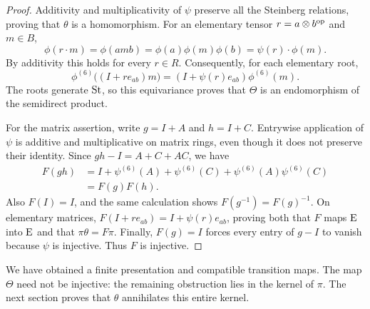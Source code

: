 \begin{proof}
Additivity and multiplicativity of $\psi$ preserve all the
Steinberg relations, proving that $\theta$ is a homomorphism.
For an elementary tensor $r=a\otimes b^{\mathrm{op}}$ and $m\in B$,
\[
 \phi(r\cdot m)=\phi(amb)
   =\phi(a)\phi(m)\phi(b)
   =\psi(r)\cdot\phi(m).
\]
By additivity this holds for every $r\in R$.  Consequently, for
each elementary root,
\[
 \phi^{(6)}\bigl((I+r e_{ab})m\bigr)
   =(I+\psi(r)e_{ab})\phi^{(6)}(m).
\]
The roots generate $\operatorname{St}$, so this equivariance proves that
$\Theta$ is an endomorphism of the semidirect product.

For the matrix assertion, write $g=I+A$ and $h=I+C$.
Entrywise application of $\psi$ is additive and multiplicative
on matrix rings, even though it does not preserve their identity.
Since $gh-I=A+C+AC$, we have
\begin{align*}
 F(gh)
  &=I+\psi^{(6)}(A)+\psi^{(6)}(C)
       +\psi^{(6)}(A)\psi^{(6)}(C)\\
  &=F(g)F(h).
\end{align*}
Also $F(I)=I$, and the same calculation shows
$F(g^{-1})=F(g)^{-1}$.  On elementary matrices,
$F(I+r e_{ab})=I+\psi(r)e_{ab}$, proving both that $F$ maps
$\operatorname{E}$ into $\operatorname{E}$ and that $\pi\theta=F\pi$.
Finally, $F(g)=I$ forces every entry of $g-I$ to vanish because
$\psi$ is injective.  Thus $F$ is injective.
\end{proof}

We have obtained a finite presentation and compatible transition
maps.  The map $\Theta$ need not be injective: the remaining
obstruction lies in the kernel of $\pi$.  The next section proves
that $\theta$ annihilates this entire kernel.
